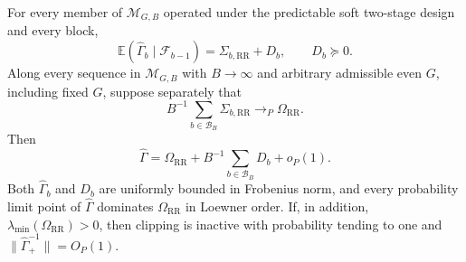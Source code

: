 For every member of \(\mathcal M_{G,B}\) operated under the predictable soft two-stage design and every block,
\[
\mathbb E(\widehat\Gamma_b\mid\mathcal F_{b-1})=\Sigma_{b,\mathrm{RR}}+D_b,
\qquad D_b\succeq0.
\]
Along every sequence in \(\mathcal M_{G,B}\) with \(B\to\infty\) and arbitrary admissible even \(G\), including fixed \(G\), suppose separately that
\[
B^{-1}\sum_{b\in\mathcal B_B}\Sigma_{b,\mathrm{RR}}\to_P\Omega_{\mathrm{RR}}.
\]
Then
\[
\widehat\Gamma=\Omega_{\mathrm{RR}}+B^{-1}\sum_{b\in\mathcal B_B}D_b+o_P(1).
\]
Both \(\widehat\Gamma_b\) and \(D_b\) are uniformly bounded in Frobenius norm, and every probability limit point of \(\widehat\Gamma\) dominates \(\Omega_{\mathrm{RR}}\) in Loewner order.  If, in addition, \(\lambda_{\min}(\Omega_{\mathrm{RR}})>0\), then clipping is inactive with probability tending to one and \(\|\widehat\Gamma_+^{-1}\|=O_P(1)\).